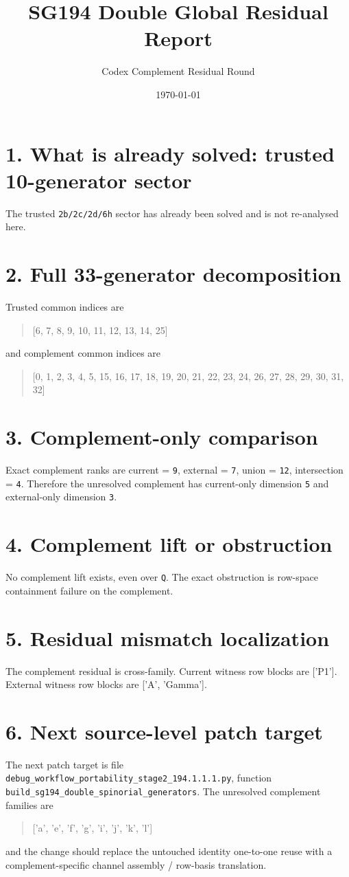 \documentclass[11pt]{article}
\title{SG194 Double Global Residual Report}
\author{Codex Complement Residual Round}
\date{\today}
\begin{document}
\maketitle

\section*{1. What is already solved: trusted 10-generator sector}
The trusted \texttt{2b/2c/2d/6h} sector has already been solved and is not re-analysed here.

\section*{2. Full 33-generator decomposition}
Trusted common indices are
\begin{quote}
[6, 7, 8, 9, 10, 11, 12, 13, 14, 25]
\end{quote}
and complement common indices are
\begin{quote}
[0, 1, 2, 3, 4, 5, 15, 16, 17, 18, 19, 20, 21, 22, 23, 24, 26, 27, 28, 29, 30, 31, 32]
\end{quote}

\section*{3. Complement-only comparison}
Exact complement ranks are current = \texttt{9}, external = \texttt{7}, union = \texttt{12}, intersection = \texttt{4}. Therefore the unresolved complement has current-only dimension \texttt{5} and external-only dimension \texttt{3}.

\section*{4. Complement lift or obstruction}
No complement lift exists, even over \texttt{Q}. The exact obstruction is row-space containment failure on the complement.

\section*{5. Residual mismatch localization}
The complement residual is cross-family. Current witness row blocks are ['P1']. External witness row blocks are ['A', 'Gamma'].

\section*{6. Next source-level patch target}
The next patch target is file \texttt{debug\_workflow\_portability\_stage2\_194.1.1.1.py}, function \texttt{build\_sg194\_double\_spinorial\_generators}. The unresolved complement families are
\begin{quote}
['a', 'e', 'f', 'g', 'i', 'j', 'k', 'l']
\end{quote}
and the change should replace the untouched identity one-to-one reuse with a complement-specific channel assembly / row-basis translation.
\end{document}

